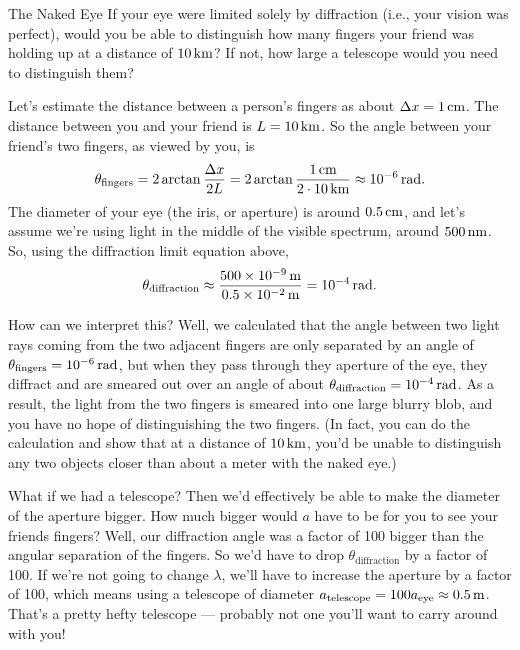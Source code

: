 \begin{example}{The Naked Eye}
\label{exampleNakedEye}
If your eye were limited solely by diffraction (i.e., your vision was perfect),
would you be able to distinguish how many fingers your friend
was holding up at a distance of $10\,\mbox{km}$? If not, how large a telescope
would you need to distinguish them?

\solution Let's estimate the distance between a person's fingers as
about $\Delta x=1\,\mbox{cm}$.  The distance between you and your
friend is $L=10\,\mbox{km}$.  So the angle between your friend's two
fingers, as viewed by you, is
\begin{equation}
\theta_\text{fingers}=2\arctan\frac{\Delta
  x}{2L}=2\arctan\frac{1\,\mbox{cm}}{2\cdot 10\,\mbox{km}}\approx
10^{-6}\,\mbox{rad}.
\end{equation}
The diameter of your eye (the iris, or aperture) is around
$0.5\,\mbox{cm}$, and let's assume we're using light in the middle of
the visible spectrum, around $500\,\mbox{nm}$.  So, using the
diffraction limit equation above,
\begin{equation}
\theta_\text{diffraction}\approx \frac{500\times
  10^{-9}\,\mbox{m}}{0.5\times 10^{-2}\,\mbox{m}} =10^{-4}\,\mbox{rad}.
\end{equation}

How can we interpret this? Well, we calculated that the angle between
two light rays coming from the two adjacent fingers are only separated
by an angle of $\theta_\text{fingers}=10^{-6}\,\mbox{rad}$, but when
they pass through they aperture of the eye, they diffract and are
smeared out over an angle of about
$\theta_\text{diffraction}=10^{-4}\,\mbox{rad}$.  As a result, the
light from the two fingers is smeared into one large blurry blob, and
you have no hope of distinguishing the two fingers.  (In fact, you can
do the calculation and show that at a distance of $10\,\mbox{km}$,
you'd be unable to distinguish any two objects closer than about a
meter with the naked eye.)

What if we had a telescope? Then we'd effectively be able to make the
diameter of the aperture bigger.  How much bigger would $a$ have to be
for you to see your friends fingers?  Well, our diffraction angle was
a factor of 100 bigger than the angular separation of the fingers. So
we'd have to drop $\theta_\text{diffraction}$ by a factor of 100.  If
we're not going to change $\lambda$, we'll have to increase the
aperture by a factor of 100, which means using a telescope of diameter
$a_\text{telescope} = 100a_\text{eye} \approx 0.5\,\mbox{m}$.  That's a
pretty hefty telescope --- probably not one you'll want to carry around
with you!

\end{example}


